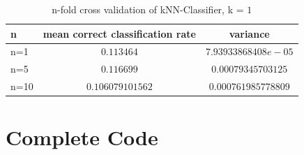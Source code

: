 \documentclass{article}
\begin{document}
\begin{table}[htb]
	\centering
	\begin{tabular}{|l|c|c|}
		\hline
		n & mean correct classification rate & variance\\ \hline
		n=1 & $0.113464$ & $7.93933868408e-05$\\ \hline
		n=5 & $0.116699$ & $0.00079345703125$\\ \hline
		n=10 & $0.106079101562$ & $0.000761985778809$\\ \hline		
	\end{tabular}
\caption{n-fold cross validation of kNN-Classifier, k = $1$}
\label{Tab3}
\end{table}


\section{Complete Code}


\end{document}
